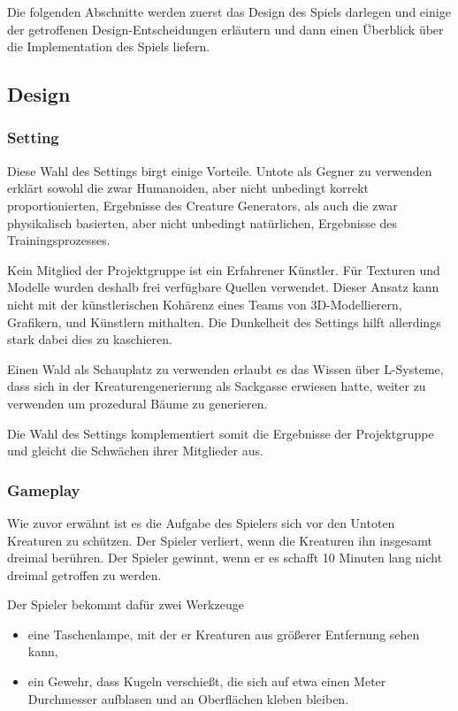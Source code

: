 Die folgenden Abschnitte werden zuerst das Design des Spiels darlegen und einige der getroffenen Design-Entscheidungen erläutern und dann einen Überblick über die Implementation des Spiels liefern.

\subsection{Design}

\subsubsection{Setting}

Diese Wahl des Settings birgt einige Vorteile.
Untote als Gegner zu verwenden erklärt sowohl die zwar Humanoiden, aber nicht unbedingt korrekt proportionierten, Ergebnisse des Creature Generators, als auch die zwar physikalisch basierten, aber nicht unbedingt natürlichen, Ergebnisse des Trainingsprozesses.

Kein Mitglied der Projektgruppe ist ein Erfahrener Künstler.
Für Texturen und Modelle wurden deshalb frei verfügbare Quellen verwendet.
Dieser Ansatz kann nicht mit der künstlerischen Kohärenz eines Teams von 3D-Modellierern, Grafikern, und Künstlern mithalten.
Die Dunkelheit des Settings hilft allerdings stark dabei dies zu kaschieren.

Einen Wald als Schauplatz zu verwenden erlaubt es das  Wissen über L-Systeme, dass sich in der Kreaturengenerierung als Sackgasse erwiesen hatte, weiter zu verwenden um prozedural Bäume zu generieren.

Die Wahl des Settings komplementiert somit die Ergebnisse der Projektgruppe und gleicht die Schwächen ihrer Mitglieder aus.

\subsubsection{Gameplay}
\label{sec:design-gameplay}
Wie zuvor erwähnt ist es die Aufgabe des Spielers sich vor den Untoten Kreaturen zu schützen.
Der Spieler verliert, wenn die Kreaturen ihn insgesamt dreimal berühren.
Der Spieler gewinnt, wenn er es schafft 10 Minuten lang nicht dreimal getroffen zu werden.

Der Spieler bekommt dafür zwei Werkzeuge
\begin{itemize}
    \item eine Taschenlampe, mit der er Kreaturen aus größerer Entfernung sehen kann,
    \item ein Gewehr, dass Kugeln verschießt, die sich auf etwa einen Meter Durchmesser aufblasen und an Oberflächen kleben bleiben.
\end{itemize}

